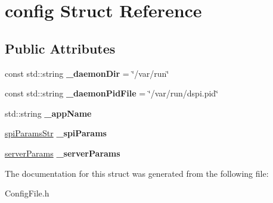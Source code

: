 \hypertarget{structconfig}{\section{config Struct Reference}
\label{structconfig}
}
\subsection*{Public Attributes}
\begin{DoxyCompactItemize}
\item 
\hypertarget{structconfig_affd1e4fdeeb5bd09b7f037fe642932a9}{const std\-::string {\bfseries \-\_\-daemon\-Dir} = \char`\"{}/var/run\char`\"{}}\label{structconfig_affd1e4fdeeb5bd09b7f037fe642932a9}

\item 
\hypertarget{structconfig_ab4f00bce3683d1c2464380b3631ef2f2}{const std\-::string {\bfseries \-\_\-daemon\-Pid\-File} = \char`\"{}/var/run/dspi.\-pid\char`\"{}}\label{structconfig_ab4f00bce3683d1c2464380b3631ef2f2}

\item 
\hypertarget{structconfig_ae0091570b7bee3d1b418f3c0f9ae446e}{std\-::string {\bfseries \-\_\-app\-Name}}\label{structconfig_ae0091570b7bee3d1b418f3c0f9ae446e}

\item 
\hypertarget{structconfig_a720319d92313892a3cb3094f7dcf4730}{\hyperlink{structspiParamsStr}{spi\-Params\-Str} {\bfseries \-\_\-spi\-Params}}\label{structconfig_a720319d92313892a3cb3094f7dcf4730}

\item 
\hypertarget{structconfig_aa8294046e3a51d625db081163c63b438}{\hyperlink{structserverParams}{server\-Params} {\bfseries \-\_\-server\-Params}}\label{structconfig_aa8294046e3a51d625db081163c63b438}

\end{DoxyCompactItemize}


The documentation for this struct was generated from the following file\-:\begin{DoxyCompactItemize}
\item 
Config\-File.\-h\end{DoxyCompactItemize}
